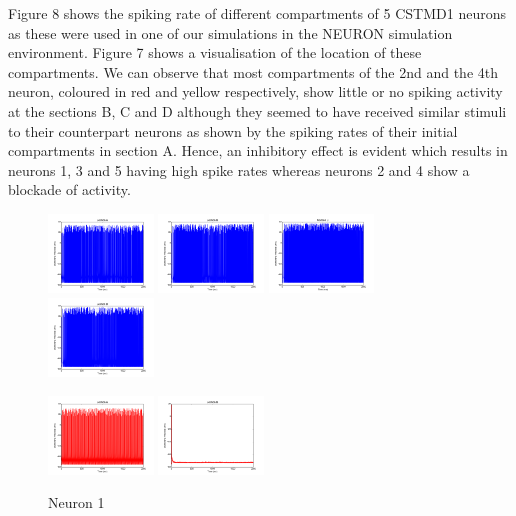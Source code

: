 \documentclass[a4paper,11pt]{article}
\begin{document}
Figure 8 shows the spiking rate of different compartments of 5 CSTMD1 neurons as these were used in one of our simulations in the NEURON simulation environment. Figure 7 shows a visualisation of the location of these compartments. We can observe that most compartments of the 2nd and the 4th neuron, coloured in red and yellow respectively, show little or no spiking activity at the sections B, C and D although they seemed to have received similar stimuli to their counterpart neurons as shown by the spiking rates of their initial compartments in section A. Hence, an inhibitory effect is evident which results in neurons 1, 3 and 5 having high spike rates whereas neurons 2 and 4 show a blockade of activity.
\newpage
\begin{figure}[H]
\centering
\begin{minipage}{0.18\textwidth}
\includegraphics[width = 1.1in]{cstmd_comp0}
\includegraphics[width = 1.1in]{cstmd_comp1}
\includegraphics[width = 1.1in]{cstmd_comp2} 
\includegraphics[width = 1.1in]{cstmd_comp3}
\caption* {Neuron 1}
\end{minipage}
\begin{minipage}{0.18\textwidth}
\includegraphics[width = 1.1in]{cstmd_comp4} 
\includegraphics[width = 1.1in]{cstmd_comp5} 

\end{minipage}
\end{figure}
\end{document}
